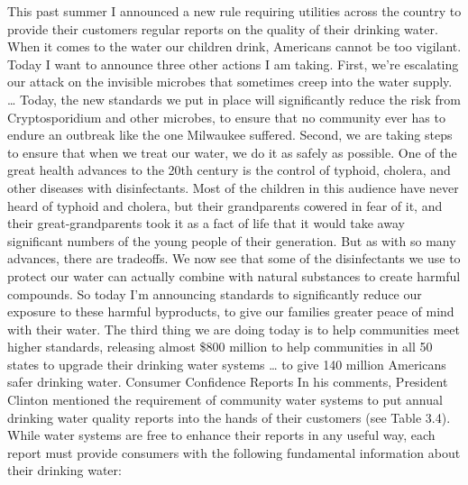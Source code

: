 \documentclass{article}
\begin{document}
This past summer I announced a new rule requiring utilities across the
country to provide their customers regular reports on the quality of
their drinking water. When it comes to the water our children drink,
Americans cannot be too vigilant. Today I want to announce three other
actions I am taking. First, we're escalating our attack on the invisible
microbes that sometimes creep into the water supply. \ldots{} Today, the
new standards we put in place will significantly reduce the risk from
Cryptosporidium and other microbes, to ensure that no community ever has
to endure an outbreak like the one Milwaukee suffered. Second, we are
taking steps to ensure that when we treat our water, we do it as safely
as possible. One of the great health advances to the 20th century is the
control of typhoid, cholera, and other diseases with disinfectants. Most
of the children in this audience have never heard of typhoid and
cholera, but their grandparents cowered in fear of it, and their
great-grandparents took it as a fact of life that it would take away
significant numbers of the young people of their generation. But as with
so many advances, there are tradeoffs. We now see that some of the
disinfectants we use to protect our water can actually combine with
natural substances to create harmful compounds. So today I'm announcing
standards to significantly reduce our exposure to these harmful
byproducts, to give our families greater peace of mind with their water.
The third thing we are doing today is to help communities meet higher
standards, releasing almost \$800 million to help communities in all 50
states to upgrade their drinking water systems \ldots{} to give 140
million Americans safer drinking water. Consumer Confidence Reports In
his comments, President Clinton mentioned the requirement of community
water systems to put annual drinking water quality reports into the
hands of their customers (see Table 3.4). While water systems are free
to enhance their reports in any useful way, each report must provide
consumers with the following fundamental information about their
drinking water:
\end{document}
